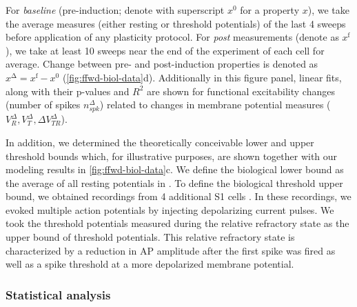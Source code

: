 For \textit{baseline} (pre-induction; denote with superscript $x^{\mathrm{0}}$ for a property $x$),
        we take the average measures (either resting or threshold potentials)
        of the last 4 sweeps before application of any plasticity protocol.
    For \textit{post} measurements (denote as $x^{\mathrm{f}}$),
        we take at least 10 sweeps near the end of the experiment of each cell for average.
    Change between pre- and post-induction properties is denoted as
        $x^{\mathrm{\Delta}} = x^{\mathrm{f}} - x^{\mathrm{0}}$
        (\autoref{fig:ffwd-biol-data}d).
    Additionally in this figure panel, linear fits, along with their p-values and $R^2$
        are shown for functional excitability changes
        (number of spikes $n_{spk}^{\Delta}$)
        related to changes in membrane potential measures
        ($V_R^{\Delta}, V_T^{\Delta}, \Delta V_{TR}^{\Delta}$).

In addition, we determined the theoretically conceivable lower and upper threshold bounds
        which, for illustrative purposes, are shown together
        with our modeling results in \autoref{fig:ffwd-biol-data}c.
    We define the biological lower bound
        as the average of all resting potentials in \cite{Gill2020-wy}
        .
    To define the biological threshold upper bound,
        we obtained recordings from 4 additional S1 cells
        \citep[same recording conditions as in][]{Gill2020-wy}.
    In these recordings, we evoked multiple action potentials
        by injecting depolarizing current pulses.
    We took the threshold potentials measured
        during the relative refractory state
        as the upper bound of threshold potentials.
    This relative refractory state is characterized
        by a reduction in AP amplitude after the first spike was fired
        as well as a spike threshold at a more depolarized membrane potential.


\subsubsection{Statistical analysis}



